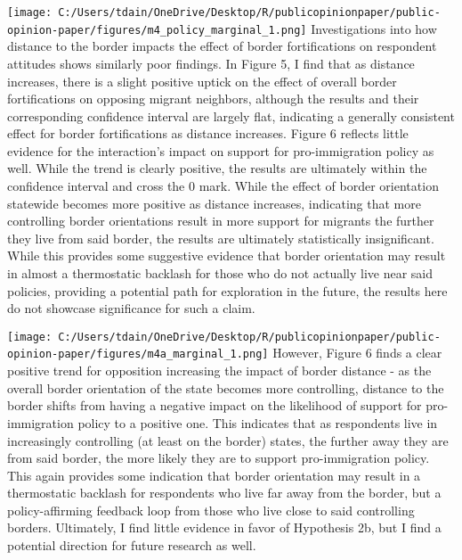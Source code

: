 \documentclass[12pt,]{article}
\begin{document}
\texttt{[image: C:/Users/tdain/OneDrive/Desktop/R/publicopinionpaper/public-opinion-paper/figures/m4\_policy\_marginal\_1.png]}
Investigations into how distance to the border impacts the effect of
border fortifications on respondent attitudes shows similarly poor
findings. In Figure 5, I find that as distance increases, there is a
slight positive uptick on the effect of overall border fortifications on
opposing migrant neighbors, although the results and their corresponding
confidence interval are largely flat, indicating a generally consistent
effect for border fortifications as distance increases. Figure 6
reflects little evidence for the interaction's impact on support for
pro-immigration policy as well. While the trend is clearly positive, the
results are ultimately within the confidence interval and cross the 0
mark. While the effect of border orientation statewide becomes more
positive as distance increases, indicating that more controlling border
orientations result in more support for migrants the further they live
from said border, the results are ultimately statistically
insignificant. While this provides some suggestive evidence that border
orientation may result in almost a thermostatic backlash for those who
do not actually live near said policies, providing a potential path for
exploration in the future, the results here do not showcase significance
for such a claim.

\texttt{[image: C:/Users/tdain/OneDrive/Desktop/R/publicopinionpaper/public-opinion-paper/figures/m4a\_marginal\_1.png]}
However, Figure 6 finds a clear positive trend for opposition increasing
the impact of border distance - as the overall border orientation of the
state becomes more controlling, distance to the border shifts from
having a negative impact on the likelihood of support for
pro-immigration policy to a positive one. This indicates that as
respondents live in increasingly controlling (at least on the border)
states, the further away they are from said border, the more likely they
are to support pro-immigration policy. This again provides some
indication that border orientation may result in a thermostatic backlash
for respondents who live far away from the border, but a
policy-affirming feedback loop from those who live close to said
controlling borders. Ultimately, I find little evidence in favor of
Hypothesis 2b, but I find a potential direction for future research as
well.
\end{document}
